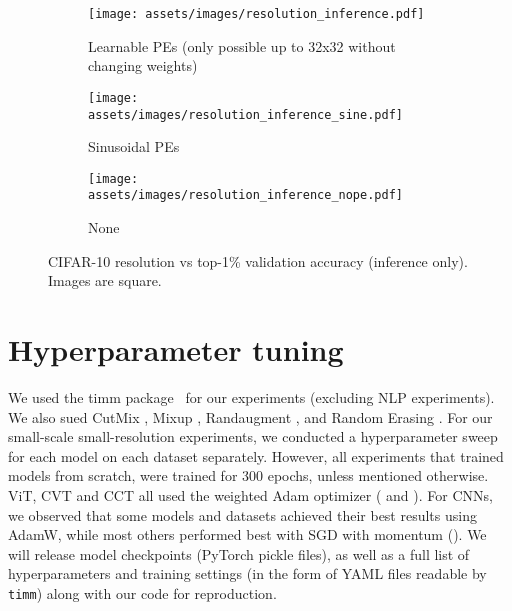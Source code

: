 \documentclass[10pt,twocolumn,letterpaper]{article}
\begin{document}
\begin{figure}[h!]
     \centering
     \begin{subfigure}[b]{0.42\textwidth}
         \centering
         \texttt{[image: assets/images/resolution\_inference.pdf]}
         \caption{Learnable PEs (only possible up to 32x32 without changing weights)}
     \end{subfigure}
     \hfill
     \begin{subfigure}[b]{0.42\textwidth}
         \centering
         \texttt{[image: assets/images/resolution\_inference\_sine.pdf]}
         \caption{Sinusoidal PEs}
     \end{subfigure}
     \hfill
     \begin{subfigure}[b]{0.42\textwidth}
         \centering
         \texttt{[image: assets/images/resolution\_inference\_nope.pdf]}
         \caption{None}
     \end{subfigure}
    \caption{CIFAR-10 resolution vs top-1\% validation accuracy (inference only). Images are square.}
    \label{fig:sizeruns_inference}
\end{figure}

\section{Hyperparameter tuning}
\label{appdx:hyperparam}
We used the timm package~\cite{rw2019timm} for our experiments (excluding NLP experiments).
We also sued CutMix \cite{yun2019cutmix}, Mixup \cite{zhang2017mixup}, Randaugment \cite{cubuk2020randaugment}, and Random Erasing \cite{zhong2020random}.
For our small-scale small-resolution experiments, we conducted a hyperparameter sweep for each model on each dataset separately.
However, all experiments that trained models from scratch, were trained for 300 epochs, unless mentioned otherwise. ViT, CVT and CCT all used the weighted Adam optimizer ( and ). For CNNs, we observed that some models and datasets achieved their best results using AdamW, while most others performed best with SGD with momentum ().
We will release model checkpoints (PyTorch pickle files), as well as a full list of hyperparameters and training settings (in the form of YAML files readable by \verb|timm|) along with our code for reproduction.
\end{document}
